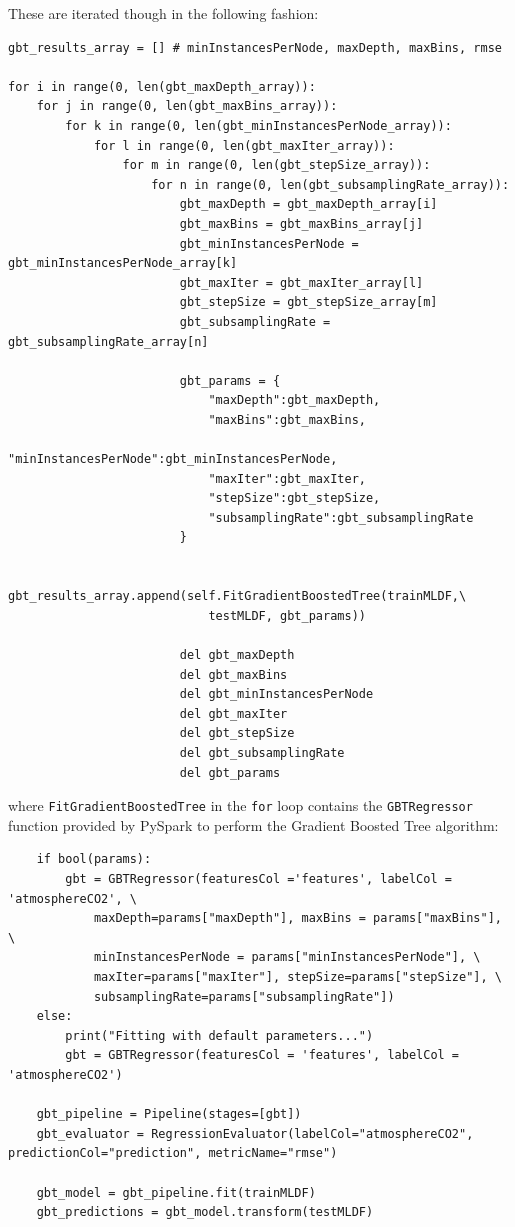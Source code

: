 \documentclass[11pt,a4paper,titlepage]{article}
\begin{document}
These are iterated though in the following fashion:

\begin{verbatim}
gbt_results_array = [] # minInstancesPerNode, maxDepth, maxBins, rmse

for i in range(0, len(gbt_maxDepth_array)):
    for j in range(0, len(gbt_maxBins_array)):
        for k in range(0, len(gbt_minInstancesPerNode_array)):
            for l in range(0, len(gbt_maxIter_array)):
                for m in range(0, len(gbt_stepSize_array)):
                    for n in range(0, len(gbt_subsamplingRate_array)):
                        gbt_maxDepth = gbt_maxDepth_array[i]
                        gbt_maxBins = gbt_maxBins_array[j]
                        gbt_minInstancesPerNode = gbt_minInstancesPerNode_array[k]
                        gbt_maxIter = gbt_maxIter_array[l]
                        gbt_stepSize = gbt_stepSize_array[m]
                        gbt_subsamplingRate = gbt_subsamplingRate_array[n]

                        gbt_params = {
                            "maxDepth":gbt_maxDepth,
                            "maxBins":gbt_maxBins,
                            "minInstancesPerNode":gbt_minInstancesPerNode,
                            "maxIter":gbt_maxIter,
                            "stepSize":gbt_stepSize,
                            "subsamplingRate":gbt_subsamplingRate
                        }

                        gbt_results_array.append(self.FitGradientBoostedTree(trainMLDF,\
                            testMLDF, gbt_params))

                        del gbt_maxDepth
                        del gbt_maxBins
                        del gbt_minInstancesPerNode
                        del gbt_maxIter
                        del gbt_stepSize
                        del gbt_subsamplingRate
                        del gbt_params
\end{verbatim}

where \texttt{FitGradientBoostedTree} in the \texttt{for} loop contains the \texttt{GBTRegressor} function provided by PySpark to perform the Gradient Boosted Tree algorithm:

\begin{verbatim}
    if bool(params):
        gbt = GBTRegressor(featuresCol ='features', labelCol = 'atmosphereCO2', \
            maxDepth=params["maxDepth"], maxBins = params["maxBins"], \
            minInstancesPerNode = params["minInstancesPerNode"], \
            maxIter=params["maxIter"], stepSize=params["stepSize"], \
            subsamplingRate=params["subsamplingRate"])
    else:
        print("Fitting with default parameters...")
        gbt = GBTRegressor(featuresCol = 'features', labelCol = 'atmosphereCO2')

    gbt_pipeline = Pipeline(stages=[gbt])
    gbt_evaluator = RegressionEvaluator(labelCol="atmosphereCO2", predictionCol="prediction", metricName="rmse")

    gbt_model = gbt_pipeline.fit(trainMLDF)
    gbt_predictions = gbt_model.transform(testMLDF)
\end{verbatim}
\end{document}
